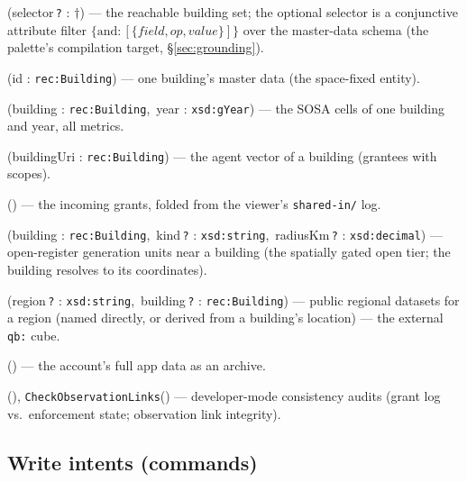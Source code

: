 \documentclass[11pt,a4paper]{article}
\theoremstyle{remark}
\begin{document}
\begin{description}\setlength\itemsep{1pt}
\item[\texttt{FindBuildings}] (selector\,\texttt{?} : $\dagger$) ---
  the reachable building set; the optional selector is a conjunctive attribute
  filter $\{\mathrm{and}: [\{\mathit{field}, \mathit{op}, \mathit{value}\}]\}$
  over the master-data schema (the palette's compilation target, \S\ref{sec:grounding}).
\item[\texttt{GetBuilding}] (id : \texttt{rec:Building}) ---
  one building's master data (the space-fixed entity).
\item[\texttt{GetObservationYear}] (building : \texttt{rec:Building},\ year : \texttt{xsd:gYear}) ---
  the SOSA cells of one building and year, all metrics.
\item[\texttt{WhoHasAccess}] (buildingUri : \texttt{rec:Building}) ---
  the agent vector of a building (grantees with scopes).
\item[\texttt{SharedWithMe}] () ---
  the incoming grants, folded from the viewer's \texttt{shared-in/} log.
\item[\texttt{FindNearbyInstallations}] (building : \texttt{rec:Building},\ kind\,\texttt{?} : \texttt{xsd:string},\ radiusKm\,\texttt{?} : \texttt{xsd:decimal}) ---
  open-register generation units near a building (the spatially gated open tier;
  the building resolves to its coordinates).
\item[\texttt{FindRegionalStatistics}] (region\,\texttt{?} : \texttt{xsd:string},\ building\,\texttt{?} : \texttt{rec:Building}) ---
  public regional datasets for a region (named directly, or derived from a
  building's location) --- the external \texttt{qb:} cube.
\item[\texttt{ExportArchive}] () --- the account's full app data as an archive.
\item[\texttt{AuditGrants}] (), \texttt{CheckObservationLinks}() ---
  developer-mode consistency audits (grant log vs.\ enforcement state; observation
  link integrity).
\end{description}

\subsection{Write intents (commands)}\label{app:writes}
\end{document}
